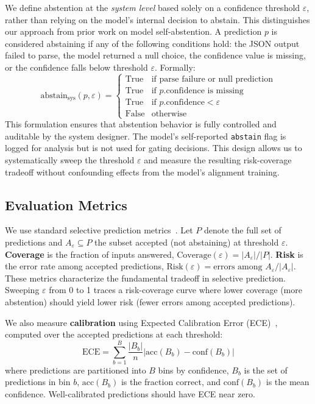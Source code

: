 \documentclass{article}
\begin{document}
We define abstention at the \emph{system level} based solely on a confidence threshold $\varepsilon$, rather than relying on the model's internal decision to abstain. This distinguishes our approach from prior work on model self-abstention. A prediction $p$ is considered abstaining if any of the following conditions hold: the JSON output failed to parse, the model returned a null choice, the confidence value is missing, or the confidence falls below threshold $\varepsilon$. Formally:
\begin{equation}
\text{abstain}_\text{sys}(p, \varepsilon) = \begin{cases}
\text{True} & \text{if parse failure or null prediction} \\
\text{True} & \text{if } p.\text{confidence} \text{ is missing} \\
\text{True} & \text{if } p.\text{confidence} < \varepsilon \\
\text{False} & \text{otherwise}
\end{cases}
\end{equation}
This formulation ensures that abstention behavior is fully controlled and auditable by the system designer. The model's self-reported \texttt{abstain} flag is logged for analysis but is not used for gating decisions. This design allows us to systematically sweep the threshold $\varepsilon$ and measure the resulting risk-coverage tradeoff without confounding effects from the model's alignment training.

\subsection{Evaluation Metrics}

We use standard selective prediction metrics~\citep{geifman2017selective}. Let $P$ denote the full set of predictions and $A_\varepsilon \subseteq P$ the subset accepted (not abstaining) at threshold $\varepsilon$. \textbf{Coverage} is the fraction of inputs answered, $\text{Coverage}(\varepsilon) = |A_\varepsilon| / |P|$. \textbf{Risk} is the error rate among accepted predictions, $\text{Risk}(\varepsilon) = \text{errors among } A_\varepsilon / |A_\varepsilon|$. These metrics characterize the fundamental tradeoff in selective prediction. Sweeping $\varepsilon$ from 0 to 1 traces a risk-coverage curve where lower coverage (more abstention) should yield lower risk (fewer errors among accepted predictions).

We also measure \textbf{calibration} using Expected Calibration Error (ECE)~\citep{guo2017calibration}, computed over the accepted predictions at each threshold:
\begin{equation}
\text{ECE} = \sum_{b=1}^{B} \frac{|B_b|}{n} \left| \text{acc}(B_b) - \text{conf}(B_b) \right|
\end{equation}
where predictions are partitioned into $B$ bins by confidence, $B_b$ is the set of predictions in bin $b$, $\text{acc}(B_b)$ is the fraction correct, and $\text{conf}(B_b)$ is the mean confidence. Well-calibrated predictions should have ECE near zero.
\end{document}
